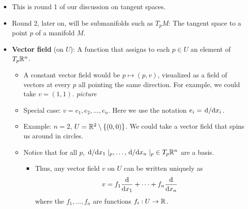 \documentclass[../notes.tex]{subfiles}
\begin{document}
\begin{itemize}
    \item This is round 1 of our discussion on tangent spaces.
    \item Round 2, later on, will be submanifolds such as $T_pM$: The tangent space to a point $p$ of a manifold $M$.
    \item \textbf{Vector field} (on $U$): A function that assigns to each $p\in U$ an element of $T_p\mathbb{R}^n$.
    \begin{itemize}
        \item A constant vector field would be $p\mapsto(p,v)$, visualized as a field of vectors at every $p$ all pointing the same direction. For example, we could take $v=(1,1)$.
        \emph{picture}
        \item Special case: $v=e_1,e_2,\dots,e_n$. Here we use the notation $e_i=\dv*{x_i}$.
        \item Example: $n=2$, $U=\mathbb{R}^2\setminus\{(0,0)\}$. We could take a vector field that spins us around in circles.
        \item Notice that for all $p$, $\dv*{x_1}|_p,\dots,\dv*{x_n}|_p\in T_p\mathbb{R}^n$ are a basis.
        \begin{itemize}
            \item Thus, any vector field $v$ on $U$ can be written uniquely as
            \begin{equation*}
                v = f_1\dv{x_1}+\cdots+f_n\dv{x_n}
            \end{equation*}
            where the $f_1,\dots,f_n$ are functions $f_i:U\to\mathbb{R}$.
        \end{itemize}
    \end{itemize}
\end{itemize}
\end{document}
